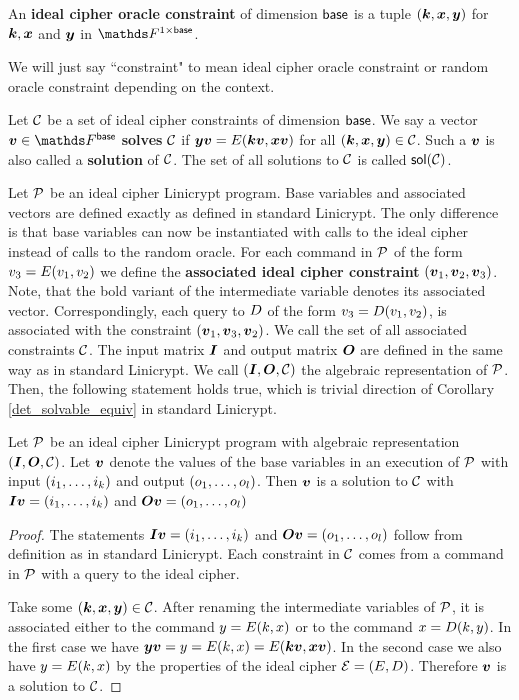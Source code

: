\begin{defn}
An \textbf{ideal cipher oracle constraint} of dimension $\base$ is a tuple $(\vk, \vx, \vy)$ for
$\vk, \vx$ and $\vy$ in $\F^{1 \times \base}$.
\end{defn}

We will just say ``constraint" to mean ideal cipher oracle constraint or random oracle constraint depending on the context.

\begin{defn}
    Let $\C$ be a set of ideal cipher constraints of dimension $\base$.
    We say a vector $\vv \in \Base$ \textbf{solves} $\C$ if
    $\vy \vv = \E(\vk \vv, \vx \vv)$ for all $(\vk, \vx, \vy) \in \C$.
    Such a $\vv$ is also called a \textbf{solution} of $\C$.
    The set of all solutions to $\C$ is called $\sol(\C)$.
\end{defn}

Let $\P$ be an ideal cipher Linicrypt program.
Base variables and associated vectors are defined exactly as defined in standard Linicrypt.
The only difference is that base variables can now be instantiated with calls to the ideal cipher instead of calls to the random oracle.
For each command in $\P$ of the form $v_3 = \E(v_1,v_2)$
we define the \textbf{associated ideal cipher constraint} $(\vv_1, \vv_2, \vv_3)$.
Note, that the bold variant of the intermediate variable denotes its associated vector.
Correspondingly, each query to $\D$ of the form $v_3 = \D(v_1,v_2)$,
is associated with the constraint $(\vv_1, \vv_3, \vv_2)$.
We call the set of all associated constraints $\C$. 
The input matrix $\I$ and output matrix $\O$ are defined in the same way as in standard Linicrypt.
We call $(\I,\O,\C)$ the algebraic representation of $\P$.
Then, the following statement holds true, which is trivial direction of Corollary \ref{det_solvable_equiv} in standard Linicrypt.

\begin{lemma}
    Let $\P$ be an ideal cipher Linicrypt program with algebraic representation $(\I,\O,\C)$.
    Let $\vv$ denote the values of the base variables in an execution of $\P$ with input $(\dts i k)$ and output $(\dts o l)$.
    Then $\vv$ is a solution to $\C$ with $\I\vv = (\dts i k)$ and $\O\vv = (\dts o l)$
\end{lemma}

\begin{proof}
    The statements $\I\vv = (\dts i k)$ and $\O\vv = (\dts o l)$ follow from definition as in standard Linicrypt.
    Each constraint in $\C$ comes from a command in $\P$ with a query to the ideal cipher.

    Take some $(\vk, \vx, \vy) \in \C$.
    After renaming the intermediate variables of $\P$,
    it is associated either to the command $y = \E(k, x)$ or to the command $x = \D(k, y)$.
    In the first case we have $\vy\vv = y = \E(k, x) = \E(\vk\vv, \vx\vv)$.
    In the second case we also have $y = \E(k,x)$
    by the properties of the ideal cipher $\mathcal{E} = (\E,\D)$.
    Therefore $\vv$ is a solution to $\C$.
\end{proof}

